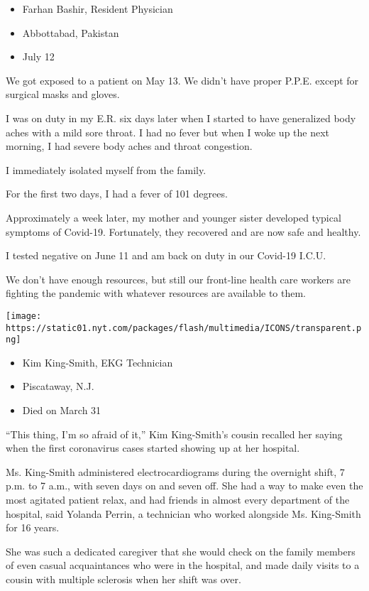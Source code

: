 \begin{itemize}
\tightlist
\item
  Farhan Bashir, Resident Physician
\item
  Abbottabad, Pakistan
\item
  July 12
\end{itemize}

We got exposed to a patient on May 13. We didn't have proper P.P.E.
except for surgical masks and gloves.

I was on duty in my E.R. six days later when I started to have
generalized body aches with a mild sore throat. I had no fever but when
I woke up the next morning, I had severe body aches and throat
congestion.

I immediately isolated myself from the family.

For the first two days, I had a fever of 101 degrees.

Approximately a week later, my mother and younger sister developed
typical symptoms of Covid-19. Fortunately, they recovered and are now
safe and healthy.

I tested negative on June 11 and am back on duty in our Covid-19 I.C.U.

We don't have enough resources, but still our front-line health care
workers are fighting the pandemic with whatever resources are available
to them.

\texttt{[image: https://static01.nyt.com/packages/flash/multimedia/ICONS/transparent.png]}

\begin{itemize}
\tightlist
\item
  Kim King-Smith, EKG Technician
\item
  Piscataway, N.J.
\item
  Died on March 31
\end{itemize}

``This thing, I'm so afraid of it,'' Kim King-Smith's cousin recalled
her saying when the first coronavirus cases started showing up at her
hospital.

Ms. King-Smith administered electrocardiograms during the overnight
shift, 7 p.m. to 7 a.m., with seven days on and seven off. She had a way
to make even the most agitated patient relax, and had friends in almost
every department of the hospital, said Yolanda Perrin, a technician who
worked alongside Ms. King-Smith for 16 years.

She was such a dedicated caregiver that she would check on the family
members of even casual acquaintances who were in the hospital, and made
daily visits to a cousin with multiple sclerosis when her shift was
over.

